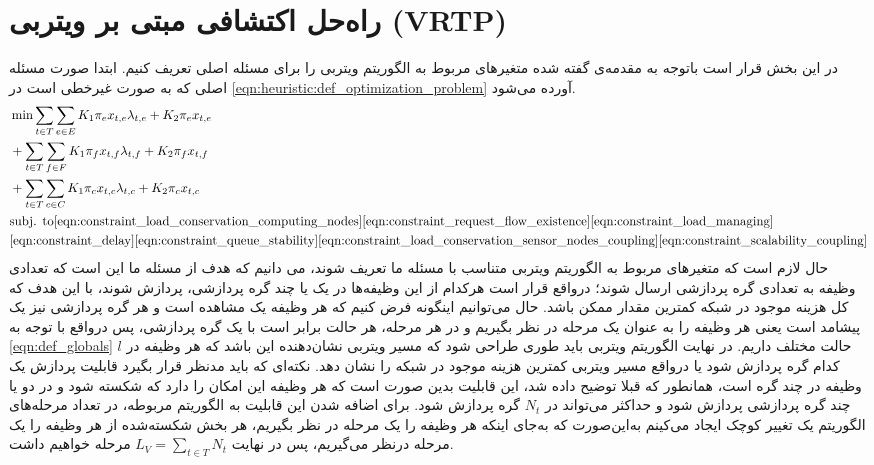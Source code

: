 \section{راه‌حل اکتشافی مبتی بر ویتربی (VRTP)}	 
	در این بخش قرار است باتوجه به مقدمه‌ی گفته شده متغیرهای مربوط به الگوریتم ویتربی را برای مسئله اصلی تعریف کنیم. 
	ابتدا صورت مسئله اصلی که به صورت غیرخطی است در \cref{eqn:heuristic:def_optimization_problem} آورده می‌شود. 
	\begin{align}\label{eqn:heuristic:def_optimization_problem}
		& \min \sum_{t \in T}\sum_{e \in E} K_1\pi_ex_{t,e}\lambda_{t,e} + K_2\pi_ex_{t,e} \notag \\
		& + \sum_{t \in T}\sum_{f \in F} K_1\pi_fx_{t,f}\lambda_{t,f} + K_2\pi_fx_{t,f} \notag \\
		& + \sum_{t \in T}\sum_{c \in C} K_1\pi_cx_{t,c}\lambda_{t,c} + K_2\pi_cx_{t,c} \notag \\
		&\text{subj. to}  %
		\cref{eqn:constraint_load_conservation_computing_nodes}
		\cref{eqn:constraint_request_flow_existence}
		\cref{eqn:constraint_load_managing}\notag \\
		&\cref{eqn:constraint_delay}
		\cref{eqn:constraint_queue_stability}
		\cref{eqn:constraint_load_conservation_sensor_nodes_coupling}
		\cref{eqn:constraint_scalability_coupling}
	\end{align}
	حال لازم است که متغیرهای مربوط به الگوریتم ویتربی متناسب با مسئله‌ ما تعریف شوند، می دانیم که هدف از مسئله ما این است که تعدادی وظیفه به تعدادی گره پردازشی ارسال شوند؛ درواقع قرار است هرکدام از این وظیفه‌ها در یک یا چند گره پردازشی، پردازش شوند، با این هدف که کل هزینه موجود در شبکه کمترین مقدار ممکن باشد. حال می‌توانیم اینگونه فرض کنیم که هر وظیفه یک مشاهده است و هر گره پردازشی نیز یک پیشامد است یعنی هر وظیفه را به عنوان یک مرحله در نظر بگیریم و در هر مرحله، هر حالت برابر است با یک گره پردازشی، پس درواقع با توجه به \cref{eqn:def_globals} $l$ حالت مختلف داریم. در نهایت الگوریتم ویتربی باید طوری طراحی شود که مسیر ویتربی نشان‌دهنده این باشد که هر وظیفه در کدام گره پردازش شود یا درواقع مسیر ویتربی کمترین هزینه موجود در شبکه را نشان دهد.
	نکته‌ای که باید مدنظر قرار بگیرد قابلیت پردازش یک وظیفه در چند گره است، همانطور که قبلا توضیح داده شد، این قابلیت بدین صورت است که هر وظیفه این امکان را دارد که شکسته شود و در دو یا چند گره پردازشی پردازش شود و حداکثر می‌تواند در $N_t$ گره پردازش شود. 
	برای اضافه شدن این قابلیت به الگوریتم مربوطه، در تعداد مرحله‌های الگوریتم یک تغییر کوچک ایجاد می‌کینم به‌این‌صورت که به‌جای اینکه هر وظیفه را یک مرحله در نظر بگیریم، هر بخش شکسته‌شده از هر وظیفه را یک مرحله درنظر می‌گیریم، پس در نهایت $ \displaystyle L_V=\sum_{t \in T} N_t$ مرحله خواهیم داشت. 
